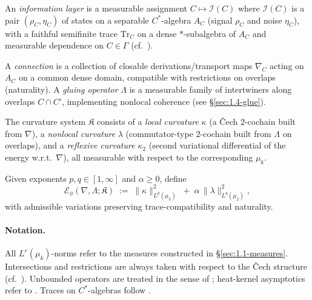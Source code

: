 \begin{definition}\label{def:1.0.info}
An \emph{information layer} is a measurable assignment $C\mapsto \mathcal I(C)$ where $\mathcal I(C)$ is a pair $(\rho_C,\eta_C)$ of states on a separable $C^*$-algebra $A_C$ (signal $\rho_C$ and noise $\eta_C$), with a faithful semifinite trace $\mathrm{Tr}_C$ on a dense $*$-subalgebra of $A_C$ and measurable dependence on $C\in\Gamma$ (cf.\ \cite{TakesakiI,Blackadar,Connes}).
\end{definition}

\begin{definition}\label{def:1.0.conn.glue}
A \emph{connection} is a collection of closable derivations/transport maps $\nabla_C$ acting on $A_C$ on a common dense domain, compatible with restrictions on overlaps (naturality). 
A \emph{gluing operator} $\Lambda$ is a measurable family of intertwiners along overlaps $C\cap C'$, implementing nonlocal coherence (see §\ref{sec:1.4-glue}).
\end{definition}

\begin{definition}\label{def:1.0.curvature}
The curvature system $\mathfrak K$ consists of a \emph{local curvature} $\kappa$ (a Čech $2$-cochain built from $\nabla$), a \emph{nonlocal curvature} $\lambda$ (commutator-type $2$-cochain built from $\Lambda$ on overlaps), and a \emph{reflexive curvature} $\kappa_2$ (second variational differential of the energy w.r.t.\ $\nabla$), all measurable with respect to the corresponding $\mu_k$.
\end{definition}

\begin{definition}[Energy]\label{def:1.0.energy}
Given exponents $p,q\in[1,\infty]$ and $\alpha\ge0$, define
\[
\mathcal E_\phi(\nabla,\Lambda;\mathfrak K)
\;:=\;
\|\kappa\|_{L^p(\mu_3)}^2 \;+\; \alpha\,\|\lambda\|_{L^q(\mu_2)}^2,
\]
with admissible variations preserving trace-compatibility and naturality. 
\end{definition}

\paragraph{Notation.}
All $L^r(\mu_k)$-norms refer to the measures constructed in §\ref{sec:1.1-measures}. 
Intersections and restrictions are always taken with respect to the Čech structure (cf.\ \cite{Bredon,BottTu}). 
Unbounded operators are treated in the sense of \cite{ReedSimon1,ReedSimon2}; heat-kernel asymptotics refer to \cite{Grigoryan, Davies, Hormander1}. 
Traces on $C^*$-algebras follow \cite{TakesakiI,Blackadar,Connes}.

